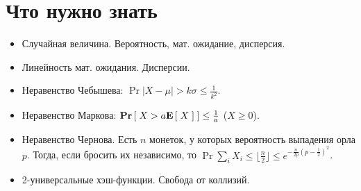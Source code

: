 \section{Что нужно знать} %
\label{sec:prereqs}

\begin{itemize}
	\item Случайная величина. Вероятность, мат. ожидание, дисперсия.
	\item Линейность мат. ожидания. Дисперсии.
	\item Неравенство Чебышева: $\Pr{|X - \mu| > k \sigma} \leq \frac{1}{k^2}$.
	\item Неравенство Маркова: $\textbf{Pr}\left[\; X > a \textbf{E}\left[\; X \;\right] \;\right] \leq \frac{1}{a}$ ($X \geq 0$).
	\item Неравенство Чернова. Есть $n$ монеток, у которых вероятность выпадения орла $p$.
	Тогда, если бросить их независимо, то $\Pr{\sum_i X_i \leq \lfloor \frac{n}{2} \rfloor} \leq e^{-\frac{n}{2p}(p - \frac{1}{2})^2}$.
	\item 2-универсальные хэш-функции. Свобода от коллизий.

\end{itemize}

